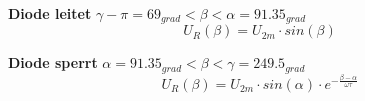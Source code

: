 \textbf{Diode leitet} $ \gamma - \pi = 69_{grad} < \beta < \alpha = 91.35_{grad} $\newline
\[  U_R(\beta) = U_{2m} \cdot sin(\beta)\]

\textbf{Diode sperrt} $ \alpha = 91.35_{grad}< \beta < \gamma = 249.5_{grad}  $\newline
\[  U_R(\beta)  =  U_{2m} \cdot sin(\alpha) \cdot e^{-\frac{\beta - \alpha}{\omega \tau}}\]
